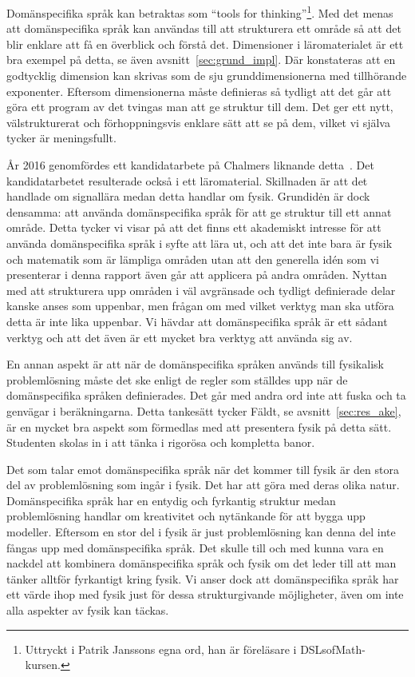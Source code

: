 Domänspecifika språk kan betraktas som ``tools for thinking''\footnote{Uttryckt i Patrik Janssons egna ord, han är föreläsare i DSLsofMath-kursen.}. Med det menas att domänspecifika språk kan användas
till att strukturera ett område så att det blir enklare att få en överblick och
förstå det. Dimensioner i läromaterialet är ett bra exempel på
detta, se även avsnitt~\ref{sec:grund_impl}. Där konstateras att en godtycklig
dimension kan skrivas som de sju grunddimensionerna med tillhörande exponenter.
Eftersom dimensionerna måste definieras så tydligt att det går att göra ett
program av det tvingas man att ge struktur till dem. Det ger ett nytt,
välstrukturerat och förhoppningsvis enklare sätt att se på dem, vilket vi själva
tycker är meningsfullt.

År 2016 genomfördes ett kandidatarbete på Chalmers liknande
detta~\cite{kandidat2016}. Det kandidatarbetet resulterade också i ett
läromaterial. Skillnaden är att det handlade om signallära medan detta handlar
om fysik. Grundidėn är dock densamma: att använda domänspecifika språk för att
ge struktur till ett annat område.  Detta tycker vi visar på att det finns ett
akademiskt intresse för att använda domänspecifika språk i syfte att lära ut,
och att det inte bara är fysik och matematik som är lämpliga områden utan att
den generella idén som vi presenterar i denna rapport även går att applicera på
andra områden. Nyttan med att strukturera upp områden i väl avgränsade och
tydligt definierade delar kanske anses som uppenbar, men frågan om med vilket
verktyg man ska utföra detta är inte lika uppenbar. Vi hävdar att domänspecifika
språk är ett sådant verktyg och att det även är ett mycket bra verktyg att
använda sig av.

En annan aspekt är att när de domänspecifika språken används till fysikalisk
problemlösning måste det ske enligt de regler som ställdes upp när de
domänspecifika språken definierades. Det går med andra ord inte att fuska och ta
genvägar i beräkningarna. Detta tankesätt tycker Fäldt, se
avsnitt~\ref{sec:res_ake}, är en mycket bra aspekt som förmedlas med att
presentera fysik på detta sätt. Studenten skolas in i att tänka i rigorösa och
kompletta banor.

Det som talar emot
domänspecifika språk när det kommer till fysik är den stora del av problemlösning
som ingår i fysik. Det har att göra med deras olika natur. Domänspecifika språk
har en entydig och fyrkantig struktur medan problemlösning handlar om
kreativitet och nytänkande för att bygga upp modeller. Eftersom en stor del i fysik är just problemlösning
kan denna del inte fångas upp med domänspecifika språk. Det skulle till och med
kunna vara en nackdel att kombinera domänspecifika språk och fysik om det leder
till att man tänker alltför fyrkantigt kring fysik. Vi anser dock att
domänspecifika språk har ett värde ihop med fysik just för dessa strukturgivande
möjligheter, även om inte alla aspekter av fysik kan täckas. 

